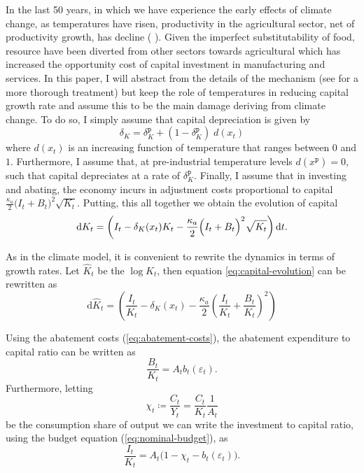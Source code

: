 \documentclass[../../main.tex]{subfiles}
\begin{document}
In the last 50 years, in which we have experience the early effects of climate change, as temperatures have risen, productivity in the agricultural sector, net of productivity growth, has decline (\citeauthor{dell_temperature_2012} \citeyear{dell_temperature_2012, dell_temperature_2009}). Given the imperfect substitutability of food, resource have been diverted from other sectors towards agricultural which has increased the opportunity cost of capital investment in manufacturing and services. In this paper, I will abstract from the details of the mechanism (see \cite{dietz_growth_2019} for a more thorough treatment) but keep the role of temperatures in reducing capital growth rate and assume this to be the main damage deriving from climate change. To do so, I simply assume that capital depreciation is given by \begin{equation}
    \delta_{K} = \delta^{\mathtt{p}}_{K} + (1 - \delta^{\mathtt{p}}_{K}) \; d(x_t)
\end{equation} where $d(x_t)$ is an increasing function of temperature that ranges between $0$ and $1$. Furthermore, I assume that, at pre-industrial temperature levels $d(x^{\mathtt{p}}) = 0$, such that capital depreciates at a rate of $\delta^{\mathtt{p}}_K$. Finally, I assume that in investing and abating, the economy incurs in adjustment costs proportional to capital $\frac{\kappa_a}{2} \big(I_t + B_t \big)^2 \sqrt{K_t}$. Putting, this all together we obtain the evolution of capital \begin{equation} \label{eq:capital-evolution}
    \mathrm{d}K_t = \left( I_t - \delta_K(x_t) K_t - \frac{\kappa_a}{2} \Big(I_t + B_t\Big)^2 \sqrt{K_t} \right) \mathrm{d}t.
\end{equation} 

As in the climate model, it is convenient to rewrite the dynamics in terms of growth rates. Let $\hat K_t$ be the $\log K_t$, then equation \ref{eq:capital-evolution} can be rewritten as \begin{equation} \label{eq:capital-evolution:log:level}
    \text{d}\hat K_t = \left( \frac{I_t}{K_t} - \delta_K(x_t) - \frac{\kappa_a}{2} \left(\frac{I_t}{K_t} + \frac{B_t}{K_t}\right)^2 \right)
\end{equation}

Using the abatement costs (\ref{eq:abatement-costs}), the abatement expenditure to capital ratio can be written as \begin{equation}
    \frac{B_t}{K_t} = A_t b_t(\varepsilon_t).
\end{equation} Furthermore, letting \begin{equation}
    \chi_t \coloneqq \frac{C_t}{Y_t} = \frac{C_t}{K_t} \frac{1}{A_t}
\end{equation} be the consumption share of output we can write the investment to capital ratio, using the budget equation (\ref{eq:nominal-budget}), as \begin{equation}
    \frac{I_t}{K_t} = A_t \Big(1 - \chi_t - b_t(\varepsilon_t)\Big).
\end{equation}
\end{document}
